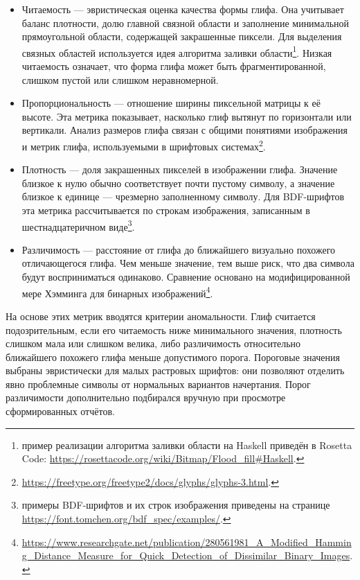 \begin{itemize}
    \item Читаемость --- эвристическая оценка качества формы глифа. Она учитывает баланс плотности, долю главной связной области и заполнение минимальной прямоугольной области, содержащей закрашенные пиксели. Для выделения связных областей используется идея алгоритма заливки области\footnote{пример реализации алгоритма заливки области на Haskell приведён в Rosetta Code: \url{https://rosettacode.org/wiki/Bitmap/Flood_fill\#Haskell}.}. Низкая читаемость означает, что форма глифа может быть фрагментированной, слишком пустой или слишком неравномерной.
    \item Пропорциональность --- отношение ширины пиксельной матрицы к её высоте. Эта метрика показывает, насколько глиф вытянут по горизонтали или вертикали. Анализ размеров глифа связан с общими понятиями изображения и метрик глифа, используемыми в шрифтовых системах\footnote{\url{https://freetype.org/freetype2/docs/glyphs/glyphs-3.html}.}.
    \item Плотность --- доля закрашенных пикселей в изображении глифа. Значение близкое к нулю обычно соответствует почти пустому символу, а значение близкое к единице --- чрезмерно заполненному символу. Для BDF-шрифтов эта метрика рассчитывается по строкам изображения, записанным в шестнадцатеричном виде\footnote{примеры BDF-шрифтов и их строк изображения приведены на странице \url{https://font.tomchen.org/bdf_spec/examples/}.}.
    \item Различимость --- расстояние от глифа до ближайшего визуально похожего отличающегося глифа. Чем меньше значение, тем выше риск, что два символа будут восприниматься одинаково. Сравнение основано на модифицированной мере Хэмминга для бинарных изображений\footnote{\url{https://www.researchgate.net/publication/280561981_A_Modified_Hamming_Distance_Measure_for_Quick_Detection_of_Dissimilar_Binary_Images}.}.
\end{itemize}

На основе этих метрик вводятся критерии аномальности. Глиф считается подозрительным, если его читаемость ниже минимального значения, плотность слишком мала или слишком велика, либо различимость относительно ближайшего похожего глифа меньше допустимого порога. Пороговые значения выбраны эвристически для малых растровых шрифтов: они позволяют отделить явно проблемные символы от нормальных вариантов начертания. Порог различимости дополнительно подбирался вручную при просмотре сформированных отчётов.

